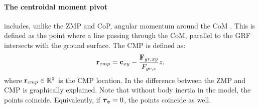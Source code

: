 \paragraph{The centroidal moment pivot} includes, unlike the \ac{ZMP} and \ac{CoP}, angular momentum around the \ac{CoM}  \cite{popovic2005ground}. This is defined as the point where a line passing through the \ac{CoM}, parallel to the \ac{GRF} intersects with the ground surface. The \ac{CMP} is defined as:
\begin{equation}
    \mathbf{r}_{cmp}=\mathbf{c}_{xy}-\frac{\mathbf{F}_{gr,xy}}{F_{gr,z}}z,
    \label{eq:cmp}
\end{equation}
where $\mathbf{r}_{cmp} \in \mathbb{R}^2$ is the \ac{CMP} location. In  the difference between the \ac{ZMP} and \ac{CMP} is graphically explained. Note that without body inertia in the model, the points coincide. Equivalently, if $\boldsymbol{\tau}_{\mathbf{c}}=0$, the points coincide as well.

